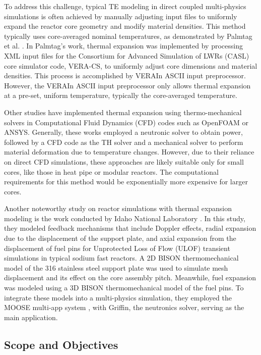 To address this challenge, typical TE modeling in direct coupled multi-physics simulations is often achieved by manually adjusting input files to uniformly expand the reactor core geometry and modify material densities. This method typically uses core-averaged nominal temperatures, as demonstrated by Palmtag et al. \cite{palmtag}. In Palmtag's work, thermal expansion was implemented by processing XML input files for the Consortium for Advanced Simulation of LWRs (CASL) core simulator code, VERA-CS, to uniformly adjust core dimensions and material densities. This process is accomplished by VERAIn ASCII input preprocessor. However, the VERAIn ASCII input preprocessor only allows thermal expansion at a pre-set, uniform temperature, typically the core-averaged temperature.

Other studies \cite{fiorina,ma_2021,guo} have implemented thermal expansion using thermo-mechanical solvers in Computational Fluid Dynamics (CFD) codes such as OpenFOAM or ANSYS. Generally, these works employed a neutronic solver to obtain power, followed by a CFD code as the TH solver and a mechanical solver to perform material deformation due to temperature changes. However, due to their reliance on direct CFD simulations, these approaches are likely suitable only for small cores, like those in heat pipe or modular reactors. The computational requirements for this method would be exponentially more expensive for larger cores.

Another noteworthy study on reactor simulations with thermal expansion modeling is the work conducted by Idaho National Laboratory \cite{cole_2021}. In this study, they modeled feedback mechanisms that include Doppler effects, radial expansion due to the displacement of the support plate, and axial expansion from the displacement of fuel pins for Unprotected Loss of Flow (ULOF) transient simulations in typical sodium fast reactors. A 2D BISON thermomechanical model of the 316 stainless steel support plate was used to simulate mesh displacement and its effect on the core assembly pitch. Meanwhile, fuel expansion was modeled using a 3D BISON thermomechanical model of the fuel pins. To integrate these models into a multi-physics simulation, they employed the MOOSE multi-app system \cite{moose_2020}, with Griffin, the neutronics solver, serving as the main application.

\subsection{Scope and Objectives}

